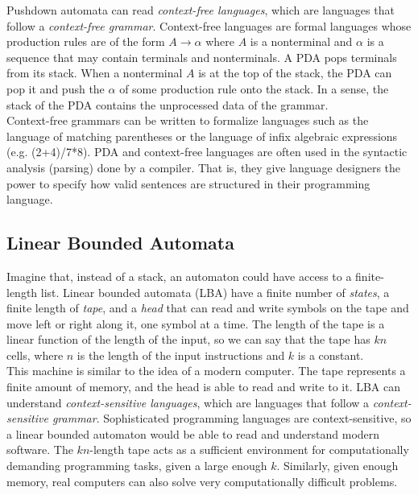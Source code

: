 Pushdown automata can read \textit{context-free languages}, which are languages that follow a \textit{context-free grammar}. Context-free languages are formal languages whose production rules are of the form $A\rightarrow\alpha$ where $A$ is a nonterminal and $\alpha$ is a sequence that may contain terminals and nonterminals. A PDA pops terminals from its stack. When a nonterminal $A$ is at the top of the stack, the PDA can pop it and push the $\alpha$ of some production rule onto the stack. In a sense, the stack of the PDA contains the unprocessed data of the grammar. \\

Context-free grammars can be written to formalize languages such as the language of matching parentheses or the language of infix algebraic expressions (e.g. (2+4)/7*8). PDA and context-free languages are often used in the syntactic analysis (parsing) done by a compiler. That is, they give language designers the power to specify how valid sentences are structured in their programming language. \\

\subsection{Linear Bounded Automata}

Imagine that, instead of a stack, an automaton could have access to a finite-length list. Linear bounded automata (LBA) have a finite number of \textit{states}, a finite length of \textit{tape}, and a \textit{head} that can read and write symbols on the tape and move left or right along it, one symbol at a time. The length of the tape is a linear function of the length of the input, so we can say that the tape has $kn$ cells, where $n$ is the length of the input instructions and $k$ is a constant. \\

This machine is similar to the idea of a modern computer. The tape represents a finite amount of memory, and the head is able to read and write to it. LBA can understand \textit{context-sensitive languages}, which are languages that follow a \textit{context-sensitive grammar}. Sophisticated programming languages are context-sensitive, so a linear bounded automaton would be able to read and understand modern software. The $kn$-length tape acts as a sufficient environment for computationally demanding programming tasks, given a large enough $k$. Similarly, given enough memory, real computers can also solve very computationally difficult problems. \\

